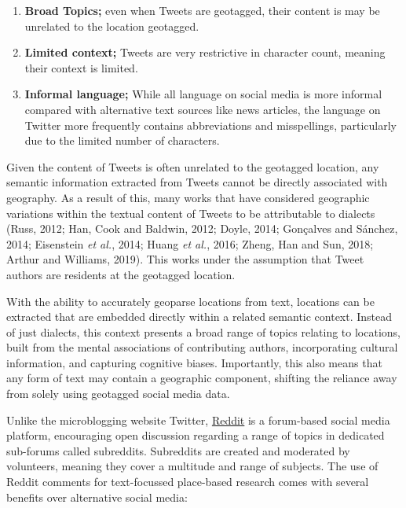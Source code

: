 \documentclass[
  letterpaper,
  11pt,
  english,
  onehalfspacing,
  headsepline]{MastersDoctoralThesis}
\providecommand{\tightlist}{%
  \setlength{\itemsep}{0pt}\setlength{\parskip}{0pt}}\usepackage{longtable,booktabs,array}
\begin{document}
\begin{enumerate}
\def\labelenumi{\arabic{enumi}.}
\tightlist
\item
  \textbf{Broad Topics;} even when Tweets are geotagged, their content
  is may be unrelated to the location geotagged.
\item
  \textbf{Limited context;} Tweets are very restrictive in character
  count, meaning their context is limited.
\item
  \textbf{Informal language;} While all language on social media is more
  informal compared with alternative text sources like news articles,
  the language on Twitter more frequently contains abbreviations and
  misspellings, particularly due to the limited number of characters.
\end{enumerate}

Given the content of Tweets is often unrelated to the geotagged
location, any semantic information extracted from Tweets cannot be
directly associated with geography. As a result of this, many works that
have considered geographic variations within the textual content of
Tweets to be attributable to dialects (Russ, 2012; Han, Cook and
Baldwin, 2012; Doyle, 2014; Gonçalves and Sánchez, 2014; Eisenstein
\emph{et al.}, 2014; Huang \emph{et al.}, 2016; Zheng, Han and Sun,
2018; Arthur and Williams, 2019). This works under the assumption that
Tweet authors are residents at the geotagged location.

With the ability to accurately geoparse locations from text, locations
can be extracted that are embedded directly within a related semantic
context. Instead of just dialects, this context presents a broad range
of topics relating to locations, built from the mental associations of
contributing authors, incorporating cultural information, and capturing
cognitive biases. Importantly, this also means that any form of text may
contain a geographic component, shifting the reliance away from solely
using geotagged social media data.

Unlike the microblogging website Twitter,
\href{https://reddit.com}{Reddit} is a forum-based social media
platform, encouraging open discussion regarding a range of topics in
dedicated sub-forums called subreddits. Subreddits are created and
moderated by volunteers, meaning they cover a multitude and range of
subjects. The use of Reddit comments for text-focussed place-based
research comes with several benefits over alternative social media:
\end{document}
